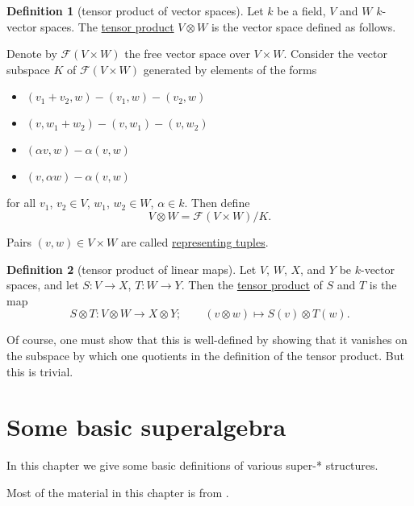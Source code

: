 \documentclass[a4paper,10pt]{scrreprt}
\newcommand{\defn}[1]{\ul{#1}}
\theoremstyle{definition}
\newtheorem{definition}{Definition}[section]
\theoremstyle{plain}
\theoremstyle{remark}
\begin{document}
\begin{definition}[tensor product of vector spaces]
  \label{def:tensorproductofvectorspaces}
  Let $k$ be a field, $V$ and $W$ $k$-vector spaces. The \defn{tensor product} $V \otimes W$ is the vector space defined as follows.

  Denote by $\mathcal{F}(V \times W)$ the free vector space over $V \times W$. Consider the vector subspace $K$ of $\mathcal{F}(V \times W)$ generated by elements of the forms 
  \begin{itemize}
    \item $(v_{1} + v_{2}, w) - (v_{1}, w) - (v_{2}, w)$
    \item $(v, w_{1} + w_{2}) - (v, w_{1}) - (v, w_{2})$
    \item $(\alpha v, w) - \alpha (v, w)$
    \item $(v, \alpha w) - \alpha (v, w)$
  \end{itemize}
  for all $v_{1}$, $v_{2} \in V$, $w_{1}$, $w_{2} \in W$, $\alpha \in k$. Then define
  \begin{equation*}
    V \otimes W = \mathcal{F}(V \times W) / K.
  \end{equation*}

  Pairs $(v, w) \in V \times W$ are called \defn{representing tuples}.
\end{definition}

\begin{definition}[tensor product of linear maps]
  \label{def:tensorproductoflinearmaps}
  Let $V$, $W$, $X$, and $Y$ be $k$-vector spaces, and let $S\colon V \to X$, $T\colon W \to Y$. Then the \defn{tensor product} of $S$ and $T$ is the map
  \begin{equation*}
    S \otimes T\colon V \otimes W \to X \otimes Y;\qquad (v \otimes w) \mapsto S(v) \otimes T(w).
  \end{equation*}

  Of course, one must show that this is well-defined by showing that it vanishes on the subspace by which one quotients in the definition of the tensor product. But this is trivial.
\end{definition}


\chapter{Some basic superalgebra} \label{ch:superalgebra}
In this chapter we give some basic definitions of various super-* structures.

Most of the material in this chapter is from \cite{manin-gauge-fields}.
\end{document}
